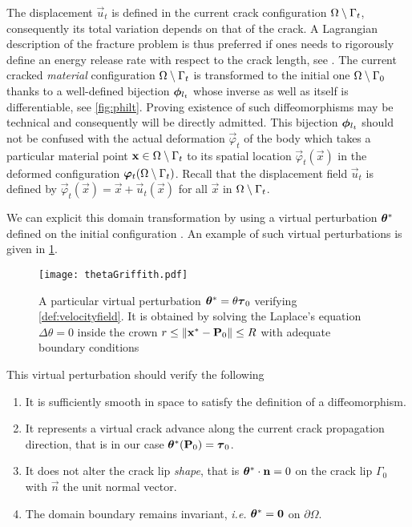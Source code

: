The displacement $\vec{u}_t$ is defined in the current crack configuration ${\Omega\setminus\Gamma_t}$, consequently its total variation depends on that of the crack. A Lagrangian description of the fracture problem is thus preferred if ones needs to rigorously define an energy release rate with respect to the crack length, see \cite{Destuynder:1981}. The current cracked \emph{material} configuration ${\Omega\setminus\Gamma_t}$ is transformed to the initial one ${\Omega\setminus\Gamma_0}$ thanks to a well-defined bijection $\philt_{l_t}$ whose inverse as well as itself is differentiable, see \cref{fig:philt}. Proving existence of such diffeomorphisms may be technical \cite{KhludnevSokolowskiSzulc:2010} and consequently will be directly admitted. This bijection $\philt_{l_t}$ should not be confused with the actual deformation $\vec{\varphi}_t$ of the body which takes a particular material point $\vec{x}\in\domaint$ to its spatial location $\vec{\varphi}_t(\vec{x})$ in the deformed configuration $\vec{\varphi}_t(\domaint)$. Recall that the displacement field $\vec{u}_t$ is defined by $\vec{\varphi}_t(\vec{x})=\vec{x}+\vec{u}_t(\vec{x})$ for all $\vec{x}$ in ${\Omega\setminus\Gamma_t}$.

We can explicit this domain transformation by using a virtual perturbation $\vtheta^*$ defined on the initial configuration \cite{Destuynder:1981,KhludnevSokolowskiSzulc:2010}. An example of such virtual perturbations is given in \cref{fig:exampletheta}.
\begin{figure}[htbp]
\centering
\texttt{[image: thetaGriffith.pdf]}
\caption{A particular virtual perturbation $\vtheta^*=\theta\vtau_0$ verifying \cref{def:velocityfield}. It is obtained by solving the Laplace's equation $\Delta\theta=0$ inside the crown $r\leq\norm{\vec{x}^*-\vec{P}_0}\leq R$ with adequate boundary conditions} \label{fig:exampletheta}
\end{figure}
This virtual perturbation should verify the following
\begin{definition} \label{def:velocityfield} \noindent
\begin{enumerate}
\item It is sufficiently smooth in space to satisfy the definition of a diffeomorphism.
\item It represents a virtual crack advance along the current crack propagation direction, that is in our case $\vtheta^*(\vec{P}_0)=\vtau_0$.
\item It does not alter the crack lip \emph{shape}, that is $\vtheta^*\cdot\vec{n}=0$ on the crack lip $\Gamma_0$ with $\vec{n}$ the unit normal vector.
\item The domain boundary remains invariant, \emph{i.e.} $\vtheta^*=\vec{0}$ on $\partial\Omega$.
\end{enumerate}
\end{definition}

